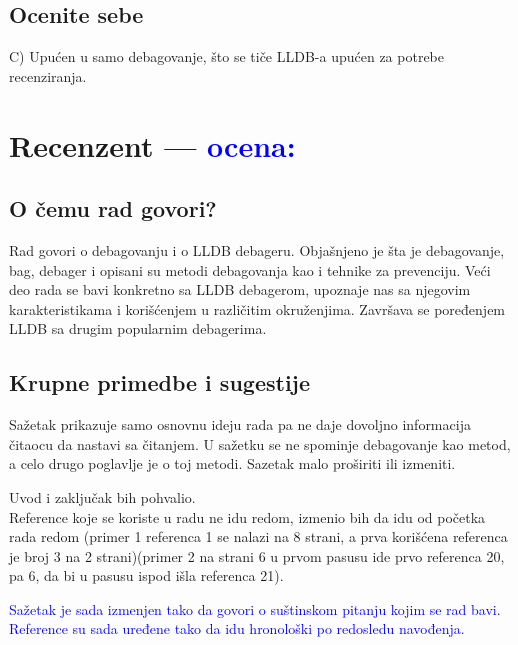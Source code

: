 \documentclass[a4paper]{report}
\newcommand{\odgovor}[1]{\textcolor{blue}{#1}}
\begin{document}
\section{Ocenite sebe}
C) Upućen u samo debagovanje, što se tiče LLDB-a upućen za potrebe recenziranja.

\chapter{Recenzent \odgovor{--- ocena:} }


\section{O čemu rad govori?}
Rad govori o debagovanju i o LLDB debageru. Objašnjeno je šta je debagovanje, bag, debager i opisani su metodi debagovanja kao i tehnike za prevenciju. Veći deo rada se bavi konkretno sa LLDB debagerom, upoznaje nas sa njegovim karakteristikama i korišćenjem u različitim okruženjima. Završava se poređenjem LLDB sa drugim popularnim debagerima.

\section{Krupne primedbe i sugestije} 
\label{section:kpis}
Sažetak prikazuje samo osnovnu ideju rada pa ne daje dovoljno informacija čitaocu da nastavi sa čitanjem. U sažetku se ne spominje debagovanje kao metod, a celo drugo poglavlje je o toj metodi.  Sazetak malo proširiti ili izmeniti.

 Uvod i zaključak bih pohvalio. \\
Reference koje se koriste u radu ne idu redom, izmenio bih da idu od početka rada redom (primer 1 referenca 1 se nalazi na 8 strani, a prva korišćena referenca je broj 3 na 2 strani)(primer 2 na strani 6 u prvom pasusu ide prvo referenca 20, pa 6, da bi u pasusu ispod išla referenca 21).

\odgovor{Sažetak je sada izmenjen tako da govori o suštinskom pitanju kojim se rad bavi. Reference su sada uređene tako da idu hronološki po redosledu navođenja.}
\end{document}
